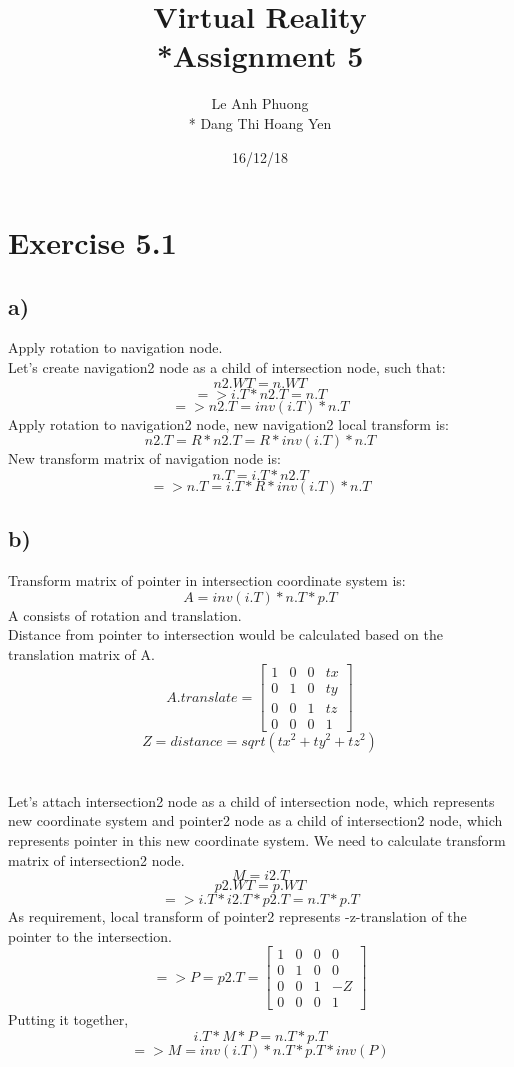 \documentclass[12pt]{article}
\title{Virtual Reality\\*Assignment 5}
\author{Le Anh Phuong\\* Dang Thi Hoang Yen}
\date{16/12/18}
\begin{document}
\maketitle

\section*{Exercise 5.1}
\subsection*{a)}

Apply rotation to navigation node.\\
Let's create navigation2 node as a child of intersection node, such that:
$$n2.WT = n.WT $$
$$=> i.T * n2.T = n.T$$
$$=> n2.T = inv(i.T) * n.T
$$
Apply rotation to navigation2 node, new navigation2 local transform is:
$$n2.T = R * n2.T = R * inv(i.T) * n.T$$
New transform matrix of navigation node is:
$$n.T = i.T * n2.T$$
$$=>n.T = i.T * R * inv(i.T) * n.T$$
\subsection*{b)}

Transform matrix of pointer in intersection coordinate system is:
$$A = inv(i.T) * n.T * p.T$$
A consists of rotation and translation.\\
Distance from pointer to intersection would be calculated based on the translation matrix of A.\\
$$
A.translate=\begin{bmatrix}
    1 & 0 & 0 & tx \\
    0 & 1 & 0 & ty \\
    0 & 0 & 1 & tz \\
    0 & 0 & 0 & 1
  \end{bmatrix}
$$
$$Z = distance = sqrt(tx^2 + ty^2 + tz^2)$$
\\\\Let's attach intersection2 node as a child of intersection node, which represents new coordinate system and pointer2 node as a child of intersection2 node, which represents pointer in this new coordinate system.
We need to calculate transform matrix of intersection2 node.
$$M = i2.T$$
$$p2.WT = p.WT$$
$$=> i.T * i2.T * p2.T = n.T * p.T$$
As requirement, local transform of pointer2 represents -z-translation of the pointer to the intersection.
$$=> P = p2.T = \begin{bmatrix}
    1 & 0 & 0 & 0 \\
    0 & 1 & 0 & 0 \\
    0 & 0 & 1 & -Z \\
    0 & 0 & 0 & 1
  \end{bmatrix}$$
Putting it together,
$$i.T * M * P = n.T * p.T$$
$$=> M = inv(i.T) * n.T * p.T * inv(P)$$
\end{document}
